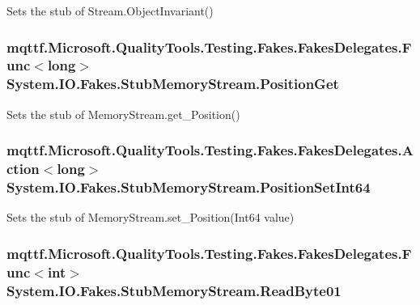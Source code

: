 Sets the stub of Stream.\-Object\-Invariant()

\hypertarget{class_system_1_1_i_o_1_1_fakes_1_1_stub_memory_stream_a05874f39d36ebfae092fd69b4785affe}{
\subsubsection[{Position\-Get}]{\setlength{\rightskip}{0pt plus 5cm}mqttf.\-Microsoft.\-Quality\-Tools.\-Testing.\-Fakes.\-Fakes\-Delegates.\-Func$<$long$>$ System.\-I\-O.\-Fakes.\-Stub\-Memory\-Stream.\-Position\-Get}}\label{class_system_1_1_i_o_1_1_fakes_1_1_stub_memory_stream_a05874f39d36ebfae092fd69b4785affe}


Sets the stub of Memory\-Stream.\-get\-\_\-\-Position()

\hypertarget{class_system_1_1_i_o_1_1_fakes_1_1_stub_memory_stream_a5f67934ef0e617b3f8cc165052c01fab}{
\subsubsection[{Position\-Set\-Int64}]{\setlength{\rightskip}{0pt plus 5cm}mqttf.\-Microsoft.\-Quality\-Tools.\-Testing.\-Fakes.\-Fakes\-Delegates.\-Action$<$long$>$ System.\-I\-O.\-Fakes.\-Stub\-Memory\-Stream.\-Position\-Set\-Int64}}\label{class_system_1_1_i_o_1_1_fakes_1_1_stub_memory_stream_a5f67934ef0e617b3f8cc165052c01fab}


Sets the stub of Memory\-Stream.\-set\-\_\-\-Position(\-Int64 value)

\hypertarget{class_system_1_1_i_o_1_1_fakes_1_1_stub_memory_stream_a88c237ed4036c4705cdb0e0781e0e9d3}{
\subsubsection[{Read\-Byte01}]{\setlength{\rightskip}{0pt plus 5cm}mqttf.\-Microsoft.\-Quality\-Tools.\-Testing.\-Fakes.\-Fakes\-Delegates.\-Func$<$int$>$ System.\-I\-O.\-Fakes.\-Stub\-Memory\-Stream.\-Read\-Byte01}}\label{class_system_1_1_i_o_1_1_fakes_1_1_stub_memory_stream_a88c237ed4036c4705cdb0e0781e0e9d3}


